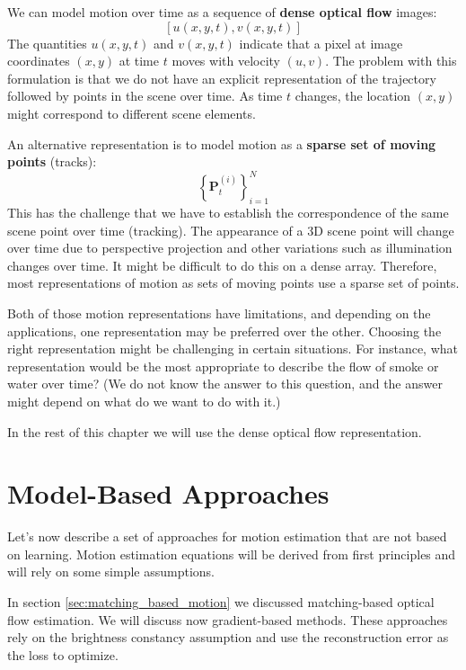We can model motion over time as a sequence of {\bf dense optical flow}  images:
\begin{equation}
    \left[ u(x,y,t), v(x,y,t) \right]
\end{equation}
The quantities $u(x,y,t)$ and $v(x,y,t)$ indicate that a pixel at image coordinates $(x,y)$ at time $t$ moves with velocity $(u,v)$. The problem with this formulation is that we do not have an explicit representation of the trajectory followed by points in the scene over time. As time $t$ changes, the location $(x,y)$ might correspond to different scene elements.


An alternative representation is to model motion as a {\bf sparse set of moving points} (tracks):
\begin{equation}
    \left\{ \mathbf{P}^{(i)}_t \right\}_{i=1}^N
\end{equation}
This has the challenge that we have to establish the correspondence of the same scene point over time (tracking). The appearance of a 3D scene point will change over time due to perspective projection and other variations such as illumination changes over time. It might be difficult to do this on a dense array. Therefore, most representations of motion as sets of moving points use a sparse set of points.



Both of those motion representations have limitations, and depending on the applications, one representation may be preferred over the other. Choosing the right representation might be challenging in certain situations. For instance, what representation would be the most appropriate to describe the flow of smoke or water over time? (We do not know the answer to this question, and the answer might depend on what do we want to do with it.)

In the rest of this chapter we will use the dense optical flow representation.


\section{Model-Based Approaches}

Let's now describe a set of approaches for motion estimation that are not based on learning. Motion estimation equations will be derived from first principles and will rely on some simple assumptions.

In section \ref{sec:matching_based_motion} we discussed matching-based optical flow estimation. We will discuss now gradient-based methods. These approaches rely on the brightness constancy assumption and use the reconstruction error as the loss to optimize. %




